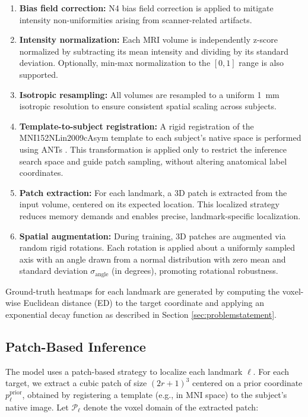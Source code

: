 \begin{enumerate}
    \item \textbf{Bias field correction:} N4 bias field correction \cite{Tustison2010-nw} is applied to mitigate intensity non-uniformities arising from scanner-related artifacts.
    
    \item \textbf{Intensity normalization:} Each MRI volume is independently z-score normalized by subtracting its mean intensity and dividing by its standard deviation. Optionally, min-max normalization to the \([0, 1]\) range is also supported.

    
    \item \textbf{Isotropic resampling:} All volumes are resampled to a uniform 1~mm isotropic resolution to ensure consistent spatial scaling across subjects.
    
    \item \textbf{Template-to-subject registration:} A rigid registration of the MNI152NLin2009cAsym template to each subject’s native space is performed using ANTs \cite{Avants2011-zs}. This transformation is applied only to restrict the inference search space and guide patch sampling, without altering anatomical label coordinates.
    
    \item \textbf{Patch extraction:} For each landmark, a 3D patch is extracted from the input volume, centered on its expected location. This localized strategy reduces memory demands and enables precise, landmark-specific localization.
    
    \item \textbf{Spatial augmentation:} During training, 3D patches are augmented via random rigid rotations. Each rotation is applied about a uniformly sampled axis with an angle drawn from a normal distribution with zero mean and standard deviation $\sigma_{\text{angle}}$ (in degrees), promoting rotational robustness.
\end{enumerate}

Ground-truth heatmaps for each landmark are generated by computing the voxel-wise Euclidean distance (ED) to the target coordinate and applying an exponential decay function as described in Section \ref{sec:problemstatement}.

\subsection{Patch-Based Inference}
The model uses a patch-based strategy to localize each landmark $\ell$. For each target, we extract a cubic patch of size $(2r+1)^3$ centered on a prior coordinate $p_\ell^{\text{prior}}$, obtained by registering a template (e.g., in MNI space) to the subject's native image. Let $\mathcal{P}_\ell$ denote the voxel domain of the extracted patch:

